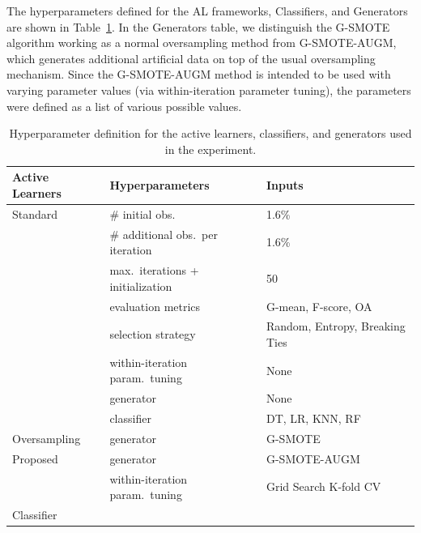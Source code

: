 \documentclass[parskip=full]{scrartcl}
\begin{document}
The hyperparameters defined for the AL frameworks, Classifiers, and Generators
are shown in Table~\ref{tab:grid}. In the Generators table, we distinguish the
G-SMOTE algorithm working as a normal oversampling method from G-SMOTE-AUGM,
which generates additional artificial data on top of the usual oversampling
mechanism. Since the G-SMOTE-AUGM method is intended to be used with varying
parameter values (via within-iteration parameter tuning), the parameters were
defined as a list of various possible values.

\begin{table}
	\centering
    \caption{\label{tab:grid}
        Hyperparameter definition for the active learners, classifiers,
        and generators used in the experiment.
    }
	\begin{tabular}{lll}
		\toprule
		Active Learners & Hyperparameters                   & Inputs                         \\
		\midrule
		Standard        & \# initial obs.\                  & 1.6\%                          \\
                        & \# additional obs.\ per iteration & 1.6\%                          \\
                        & max.\ iterations + initialization & 50                             \\
                        & evaluation metrics                & G-mean, F-score, OA            \\
                        & selection strategy                & Random, Entropy, Breaking Ties \\
                        & within-iteration param.\ tuning   & None                           \\
                        & generator                         & None                           \\
                        & classifier                        & DT, LR, KNN, RF                \\
        Oversampling    & generator                         & G-SMOTE                        \\
        Proposed        & generator                         & G-SMOTE-AUGM                   \\
                        & within-iteration param.\ tuning   & Grid Search K-fold CV          \\
		\toprule
		Classifier      &                                  &                                \\

\end{tabular}
\end{table}
\end{document}
